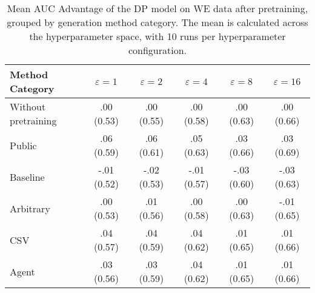 \begin{table}[h!]
    \centering
    \caption{Mean AUC Advantage of the DP model on WE data after pretraining, grouped by generation method category. The mean is calculated across the hyperparameter space, with 10 runs per hyperparameter configuration.}
    \label{tab:epsilon_comparison}
    \begin{tabular}{lccccc}
    \toprule
    Method Category & $\varepsilon=1$ & $\varepsilon=2$ & $\varepsilon=4$ & $\varepsilon=8$ & $\varepsilon=16$ \\
    \midrule
    Without pretraining & .00 {\small (0.53)} & .00 {\small (0.55)} & .00 {\small (0.58)} & .00 {\small (0.63)} & .00 {\small (0.66)} \\
    \arrayrulecolor{black!50!}\midrule
    Public & \cellcolor{gold!30}.06 {\small (0.59)} & \cellcolor{gold!30}.06 {\small (0.61)} & \cellcolor{gold!30}.05 {\small (0.63)} & \cellcolor{gold!30}.03 {\small (0.66)} & \cellcolor{gold!30}.03 {\small (0.69)} \\
    \arrayrulecolor{black!50!}\midrule
    Baseline & -.01 {\small (0.52)} & -.02 {\small (0.53)} & -.01 {\small (0.57)} & -.03 {\small (0.60)} & -.03 {\small (0.63)} \\
    \arrayrulecolor{black!50!}\midrule
    Arbitrary & .00 {\small (0.53)} & .01 {\small (0.56)} & .00 {\small (0.58)} & .00 {\small (0.63)} & \cellcolor{bronze!30}-.01 {\small (0.65)} \\
    \arrayrulecolor{black!50!}\midrule
    CSV & \cellcolor{silver!30}.04 {\small (0.57)} & \cellcolor{silver!30}.04 {\small (0.59)} & \cellcolor{silver!30}.04 {\small (0.62)} & \cellcolor{bronze!30}.01 {\small (0.65)} & \cellcolor{silver!30}.01 {\small (0.66)} \\
    Agent & \cellcolor{bronze!30}.03 {\small (0.56)} & \cellcolor{bronze!30}.03 {\small (0.59)} & \cellcolor{bronze!30}.04 {\small (0.62)} & \cellcolor{silver!30}.01 {\small (0.65)} & \cellcolor{silver!30}.01 {\small (0.66)} \\
    \bottomrule
    \end{tabular}
\end{table}